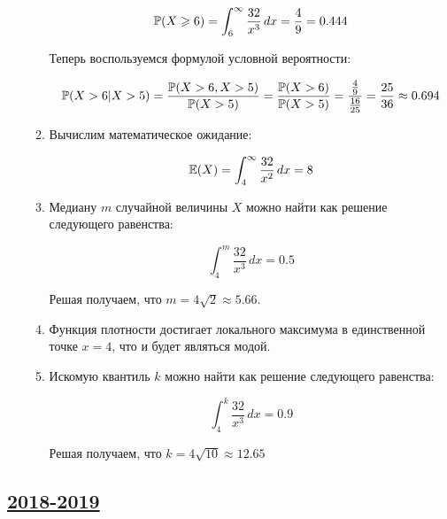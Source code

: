 \begin{enumerate}
\begin{enumerate}
		\[
		\P(X\geq6)=\int_{6}^{\infty} \frac{32}{x^3} \, dx=\frac{4}{9}=0.444
		\]
		
		Теперь воспользуемся формулой условной вероятности:
	
	\[
	\P(X>6|X>5)=\frac{\P(X>6, X>5)}{\P(X>5)}=\frac{\P(X>6)}{\P(X>5)}=\frac{\frac{4}{9}}{\frac{16}{25}}=\frac{25}{36}\approx0.694
	\]
	
	\item Вычислим математическое ожидание:
	
	\[
	\E(X)=\int_{4}^{\infty} \frac{32}{x^2} \, dx=8
	\]
	
	\item Медиану $m$ случайной величины $X$ можно найти как решение следующего равенства:
	
	\[
	\int_{4}^{m} \frac{32}{x^3} \, dx=0.5
	\]
	
	Решая получаем, что $m=4\sqrt{2}\approx 5.66$.
	
	\item Функция плотности достигает локального максимума в единственной точке $x=4$, что и будет являться модой.
	
	\item Искомую квантиль $k$ можно найти как решение следующего равенства:
	
	\[
	\int_{4}^{k} \frac{32}{x^3} \, dx=0.9
	\]
	
	Решая получаем, что $k=4\sqrt{10}\approx 12.65$
	
	\end{enumerate}
	\end{enumerate}
	
	

\subsection[2018-2019]{\hyperref[sec:kr_01_2018_2019]{2018-2019}}
\label{sec:sol_kr_01_2018_2019}

